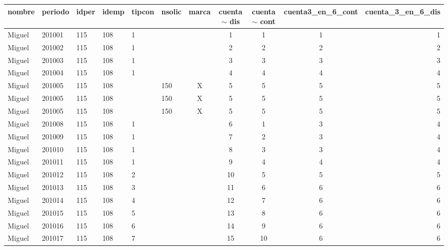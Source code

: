 \begin{tabular}{m{30pt}<{\raggedrigth}*{5}{m{20pt}<{\centering}}*{4}{c}r}
\toprule
nombre & periodo & idper & idemp & tipcon & nsolic & marca &  cuenta$\sim$ dis & cuenta$\sim$ cont & cuenta3\_en\_6\_cont & cuenta\_3\_en\_6\_dis\\ \midrule
Miguel&201001&115&108&1&&&1&1&1&1\\
Miguel&201002&115&108&1&&&2&2&2&2\\
Miguel&201003&115&108&1&&&3&3&3&3\\
Miguel&201004&115&108&1&&&4&4&4&4\\
Miguel&201005&115&108&&150&X&5&5&5&5\\
Miguel&201005&115&108&&150&X&5&5&5&5\\
Miguel&201005&115&108&&150&X&5&5&5&5\\
Miguel&201008&115&108&1&&&6&1&3&4\\
Miguel&201009&115&108&1&&&7&2&3&4\\
Miguel&201010&115&108&1&&&8&3&3&4\\
Miguel&201011&115&108&1&&&9&4&4&4\\
Miguel&201012&115&108&2&&&10&5&5&5\\
Miguel&201013&115&108&3&&&11&6&6&6\\
Miguel&201014&115&108&4&&&12&7&6&6\\
Miguel&201015&115&108&5&&&13&8&6&6\\
Miguel&201016&115&108&6&&&14&9&6&6\\
Miguel&201017&115&108&7&&&15&10&6&6\\
\bottomrule
\end{tabular}
